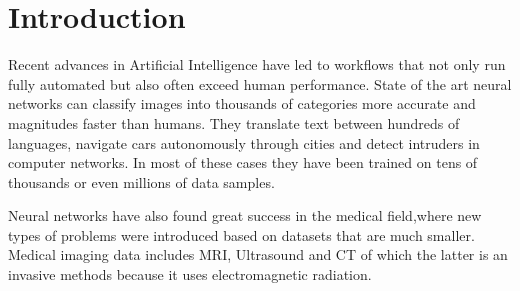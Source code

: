 \section{Introduction}

Recent advances in Artificial Intelligence have led to workflows that not only run fully automated but also often exceed human performance. State of the art neural networks can classify images into thousands of categories more accurate and magnitudes faster than humans. They translate text between hundreds of languages, navigate cars autonomously through cities and detect intruders in computer networks. In most of these cases they have been trained on tens of thousands or even millions of data samples. 

Neural networks have also found great success in the medical field,where new types of problems were introduced based on datasets that are much smaller. Medical imaging data includes MRI, Ultrasound and CT of which the latter is an invasive methods because it uses electromagnetic radiation.

\newpage
